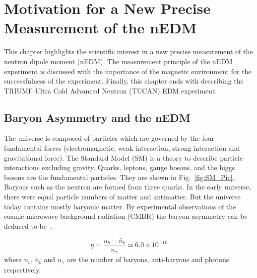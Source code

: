 \chapter{Motivation for a New Precise Measurement of the nEDM}
\label{ch:motivation} 
This chapter highlights the scientific interest in a new precise measurement of the neutron dipole moment (nEDM). The measurement principle of the nEDM experiment is discussed with the importance of the magnetic environment for the successfulness of the experiment. Finally, this chapter ends with describing the TRIUMF Ultra Cold Advanced Neutron (TUCAN) EDM experiment.

\section{Baryon Asymmetry and the nEDM}


The universe is composed of particles which are governed by the four fundamental forces (electromagnetic, weak interaction, strong interaction and gravitational force). The Standard Model (SM) is a theory to describe particle interactions excluding gravity. Quarks, leptons, gauge bosons, and the higgs bosons are the fundamental particles. They are shown in Fig.~\ref{fig:SM_Pic}. Baryons such as the neutron are formed from three quarks. In the early universe, there were equal particle numbers of matter and antimatter. But the universe today contains mostly baryonic matter. By experimental observations of the cosmic microwave background radiation (CMBR) the baryon asymmetry can be deduced to be~\cite{expBar}.


\begin{equation}\label{eq:baryons}
    \eta =\frac{n_b-\bar{n}_b}{n_\gamma}\simeq 6.0 \times 10^{-10}
\end{equation}
where $n_b$, $\bar{n}_b$ and ${n_\gamma}$ are the number of baryons, anti-baryons and photons respectively. 


